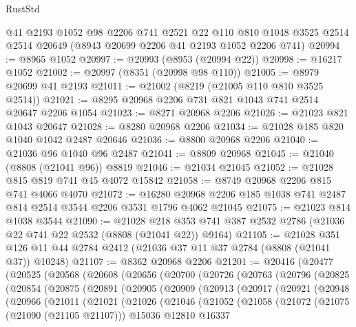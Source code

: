 \begin{lexlean}{RustStd}
\begin{coremodule}
    @41
    @2193
    @1052
    @98
    @2206
    @741
    @2521
    @22
    @110
    @810
    @1048
    @3525
    @2514
    @2514
    @20649
    (@8943 @20699 @2206 @41 @2193 @1052 @2206 @741)
@20994 := @8965 @1052
@20997 := @20993 (@8953 (@20994 @22))
@20998 := @16217 @1052
@21002 := @20997 (@8351 (@20998 @98 @110))
@21005 := @8979 @20699 @41 @2193
@21011 := @21002 (@8219 (@21005 @110 @810 @3525 @2514))
@21021 := @8295 @20968 @2206 @731 @821 @1043 @741 @2514 @20647 @2206 @1054
@21023 := @8271 @20968 @2206
@21026 := @21023 @821 @1043 @20647
@21028 := @8280 @20968 @2206
@21034 := @21028 @185 @820 @1040 @1042 @2487 @20646
@21036 := @8800 @20968 @2206
@21040 := @21036 @96 @1040 @96 @2487
@21041 := @8809 @20968
@21045 := @21040 (@8808 (@21041 @96)) @8819
@21046 := @21034 @21045
@21052 := @21028 @815 @819 @741 @45 @4072 @15842
@21058 := @8749 @20968 @2206 @815 @741 @4066 @4070
@21072 := @16280 @20968 @2206 @185 @1038 @741 @2487 @814 @2514 @3544 @2206 @3531 @1796 @4062 @21045
@21075 := @21023 @814 @1038 @3544
@21090 := @21028
    @218
    @353
    @741
    @387
    @2532
    @2786
    (@21036 @22 @741 @22 @2532 (@8808 (@21041 @22)) @9164)
@21105 := @21028
    @351
    @126
    @11
    @44
    @2784
    @2412
    (@21036 @37 @11 @37 @2784 (@8808 (@21041 @37)) @10248)
@21107 := @8362 @20968 @2206
@21201 := @20416
    (@20477
      (@20525
        (@20568
          (@20608
            (@20656
              (@20700
                (@20726
                  (@20763
                    (@20796
                      (@20825
                        (@20854
                          (@20875
                            (@20891
                              (@20905
                                (@20909
                                  (@20913
                                    (@20917
                                      (@20921
                                        (@20948
                                          (@20966
                                            (@21011
                                              (@21021
                                                (@21026
                                                  (@21046
                                                    (@21052
                                                      (@21058
                                                        (@21072
                                                          (@21075 (@21090 (@21105 @21107)))
                                                          @15036
                                                          @12810
                                                          @16337

\end{coremodule}
\end{lexlean}
